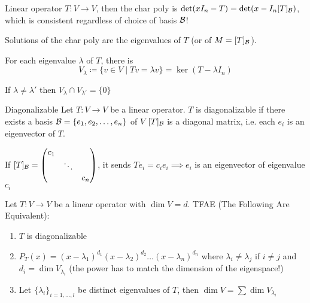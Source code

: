 
\begin{recall}
    Linear operator \(T: V \to V\), then the char poly is \(\det (x I_n - T) = \det (x - I_n [T]_{\mathcal{B}})\), which is consistent regardless of choice of basis \(\mathcal{B}\)!

    Solutions of the char poly are the eigenvalues of \(T\) (or of \(M = [T]_{\mathcal{B}}\)).

    For each eigenvalue \(\lambda\) of \(T\), there is \[
        V_\lambda \coloneqq \{v \in V \mid Tv = \lambda v\} = \ker (T - \lambda I_n)
    \]
\end{recall}

\begin{exercise}
    If \(\lambda \neq \lambda '\) then \(V_\lambda \cap V_{\lambda'} = \{0\}\)
\end{exercise}
\begin{definition} {Diagonalizable}
    Let \(T: V \to V\) be a linear operator. \(T\) is diagonalizable if there exists a basis \(\mathcal{B} = \{e_1, e_2, \dots, e_n\}\) of \(V\)  \st \([T]_{\mathcal{B}}\) is a diagonal matrix, i.e. each \(e_i\) is an eigenvector of \(T\).

    If \([T]_{\mathcal{B}} = \begin{pmatrix}
        c_1 &        &     \\
            & \ddots &     \\
            &        & c_n
    \end{pmatrix}\), it sends \(T e_i = c_i e_i \implies e_i\)  is an eigenvector of eigenvalue \(c_i\)
\end{definition}

\begin{proposition}
    Let \(T: V \to V\) be a linear operator with \(\dim V = d\). TFAE (The Following Are Equivalent):
    \begin{enumerate}
        \item \(T\) is diagonalizable
        \item \(P_T(x) = (x - \lambda_1)^{d_1}(x - \lambda_2)^{d_2}\dots (x - \lambda_n)^{d_n}\) where \(\lambda_i \neq \lambda_j\) if \(i \neq j\) and \(d_i = \dim V_{\lambda_i} \)  (the power has to match the dimension of the eigenspace!)
        \item Let \(\{\lambda_i\}_{i = 1, \dots, l}\) be distinct eigenvalues of \(T\), then \(\dim V = \sum \dim V_{\lambda_i}\)
    \end{enumerate}
\end{proposition}

